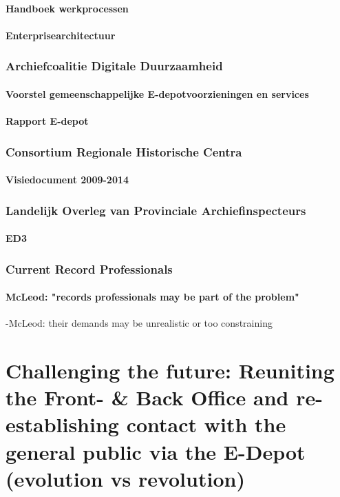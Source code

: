 \documentclass[twoside,11pt]{Latex/Classes/PhDthesisPSnPDF}
\begin{document}
\subsubsection{Handboek werkprocessen}
\subsubsection{Enterprisearchitectuur}
\subsection{Archiefcoalitie Digitale Duurzaamheid}
\subsubsection{Voorstel gemeenschappelijke E-depotvoorzieningen en services}
\subsubsection{Rapport E-depot}
\subsection{Consortium Regionale Historische Centra}
\subsubsection{Visiedocument 2009-2014}
\subsection{Landelijk Overleg van Provinciale Archiefinspecteurs}
\subsubsection{ED3}
\subsection{Current Record Professionals}
\subsubsection{McLeod: "records professionals may be part of the problem"} 
-McLeod: their demands may be unrealistic or too constraining

\chapter{Challenging the future: Reuniting the Front- \& Back Office and re-establishing contact with the general public via the E-Depot (evolution vs revolution)}
\end{document}
